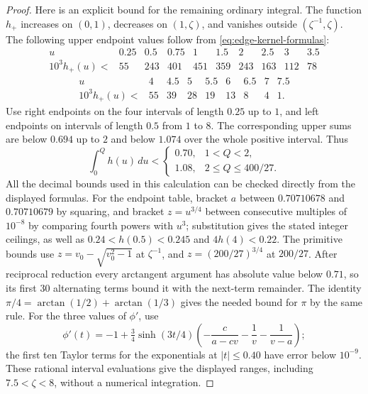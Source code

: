 \begin{proof}
Here is an explicit bound for the remaining ordinary integral. The function \(h_+\) increases on \((0,1)\), decreases on \((1,\zeta)\), and vanishes outside \((\zeta^{-1},\zeta)\). The following upper endpoint values follow from \eqref{eq:edge-kernel-formulas}:
\[
 \begin{array}{c|rrrrrrrrr}
 u&0.25&0.5&0.75&1&1.5&2&2.5&3&3.5\\ \hline
 10^3h_+(u)<&55&243&401&451&359&243&163&112&78
 \end{array}
\]
\[
 \begin{array}{c|rrrrrrrr}
 u&4&4.5&5&5.5&6&6.5&7&7.5\\ \hline
 10^3h_+(u)<&55&39&28&19&13&8&4&1.
 \end{array}
\]
Use right endpoints on the four intervals of length \(0.25\) up to \(1\), and left endpoints on intervals of length \(0.5\) from \(1\) to \(8\). The corresponding upper sums are below \(0.694\) up to \(2\) and below \(1.074\) over the whole positive interval. Thus
\begin{equation}\label{eq:first-ordinary-integral}
 \int_0^Q h(u)\,du
 <\begin{cases}0.70,&1<Q<2,\\1.08,&2\le Q\le400/27.\end{cases}
\end{equation}
All the decimal bounds used in this calculation can be checked directly from the displayed formulas. For the endpoint table, bracket \(a\) between \(0.70710678\) and \(0.70710679\) by squaring, and bracket \(z=u^{3/4}\) between consecutive multiples of \(10^{-8}\) by comparing fourth powers with \(u^3\); substitution gives the stated integer ceilings, as well as \(0.24<h(0.5)<0.245\) and \(4h(4)<0.22\). The primitive bounds use \(z=v_0-\sqrt{v_0^2-1}\) at \(\zeta^{-1}\), and \(z=(200/27)^{3/4}\) at \(200/27\). After reciprocal reduction every arctangent argument has absolute value below \(0.71\), so its first 30 alternating terms bound it with the next-term remainder. The identity \(\pi/4=\arctan(1/2)+\arctan(1/3)\) gives the needed bound for \(\pi\) by the same rule. For the three values of \(\phi'\), use
\[
 \phi'(t)=-1+\tfrac34\sinh(3t/4)
 \left(-\frac c{a-cv}-\frac1v-\frac1{v-a}\right);
\]
the first ten Taylor terms for the exponentials at \(|t|\le0.40\) have error below \(10^{-9}\). These rational interval evaluations give the displayed ranges, including \(7.5<\zeta<8\), without a numerical integration.


\end{proof}
